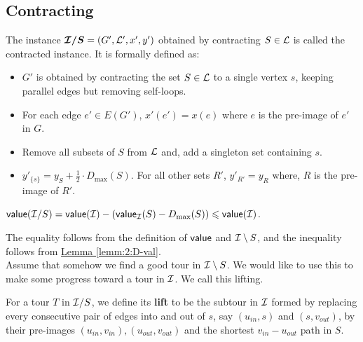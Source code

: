 \documentclass[./main.tex]{subfiles}
\begin{document}
	\subsection{Contracting}
	\begin{definition}
		The instance $\bm{\mathcal{I}/S} = (G', \mathcal{L}', x', y')$ obtained by contracting $S\in \mathcal{L}$ is called the contracted instance. It is formally defined as:
		\begin{itemize}[-]
			\item $G'$ is obtained by contracting the set $S \in \mathcal{L}$ to a single vertex $s$, keeping parallel edges but removing self-loops.
			\item For each edge $e' \in E(G')$, $x'(e') = x(e)$ where $e$ is the pre-image of $e'$ in $G$.
			\item Remove all subsets of $S$ from $\mathcal{L}$ and, add a singleton set containing $s$.
			\item $y'_{\{s\}} = y_S + \frac{1}{2}\cdot D_{\max}(S)$. For all other sets $R'$, $y'_{R'} = y_R$ where, $R$ is the pre-image of $R'$.
		\end{itemize}
	\end{definition}\vspace{3mm}
	\begin{fact}\label{fact:3:val-c}
		$\textsf{\textup{value}}(\mathcal{I}/S) = \textsf{\textup{value}}(\mathcal{I}) - (\textsf{\textup{value}}_{\mathcal{I}}(S) - D_{\max}(S)) \leqslant \textsf{\textup{value}}(\mathcal{I})$.
	\end{fact}
The equality follows from the definition of $\textsf{\textup{value}}$ and $\mathcal{I}\setminus S$, and the inequality follows from \hyperref[lemm:2:D-val]{Lemma \ref{lemm:2:D-val}}.\vspace{2mm}
\\Assume that somehow we find a good tour in $\mathcal{I}\setminus S$. We would like to use this to make some progress toward a tour in $\mathcal{I}$. We call this lifting.\vspace{2mm}
	\begin{definition}
		For a tour $T$ in $\mathcal{I}/S$, we define its \textbf{lift} to be the subtour in $\mathcal{I}$ formed by replacing every consecutive pair of edges into and out of $s$, say $(u_{in}, s)$ and $(s, v_{out})$, by their pre-images $(u_{in}, v_{in}), (u_{out}, v_{out})$ and the shortest $v_{in} - u_{out}$ path in $S$.
	\end{definition}\vspace{4mm}
\end{document}

